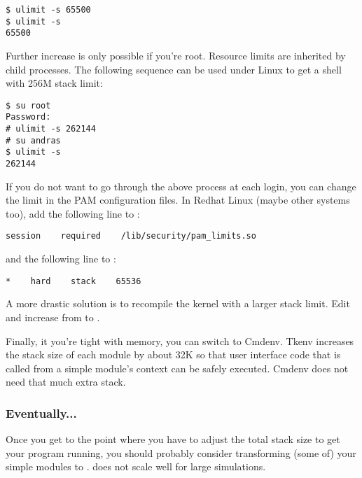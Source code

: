 \begin{verbatim}
$ ulimit -s 65500
$ ulimit -s
65500
\end{verbatim}

Further increase is only possible if you're root.
Resource limits are inherited by child processes.
The following sequence can be used under Linux to get a shell with
256M stack limit:

\begin{verbatim}
$ su root
Password:
# ulimit -s 262144
# su andras
$ ulimit -s
262144
\end{verbatim}

If you do not want to go through the above process at each login, you
can change the limit in the PAM configuration files. In Redhat Linux
(maybe other systems too), add the following line to
:

\begin{verbatim}
session    required    /lib/security/pam_limits.so
\end{verbatim}

and the following line to :

\begin{verbatim}
*    hard    stack    65536
\end{verbatim}

\begin{sloppypar}
A more drastic solution is to recompile the kernel with a larger stack
limit. Edit  and increase
 from  to .
\end{sloppypar}

Finally, it you're tight with memory, you can switch to Cmdenv. Tkenv
increases the stack size of each module by about 32K so that user interface code that is called from a
simple module's context can be safely executed.
Cmdenv does not need that much extra stack.


\subsubsection{Eventually...}

Once you get to the point where you have to adjust the total stack size
to get your program running,
you should probably consider transforming (some of) your 
simple modules to .  does not
scale well for large simulations.



